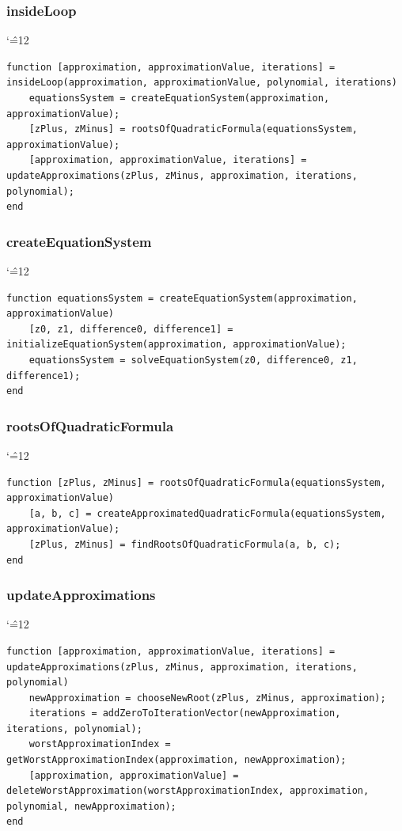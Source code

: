 \documentclass[12pt]{report}
\newenvironment{simplechar}{%
   \catcode`\^=12
}{}
\begin{document}
\subsubsection{insideLoop}
\begin{simplechar}
\begin{lstlisting}
function [approximation, approximationValue, iterations] = insideLoop(approximation, approximationValue, polynomial, iterations)
    equationsSystem = createEquationSystem(approximation, approximationValue);
    [zPlus, zMinus] = rootsOfQuadraticFormula(equationsSystem, approximationValue);
    [approximation, approximationValue, iterations] = updateApproximations(zPlus, zMinus, approximation, iterations, polynomial);
end
\end{lstlisting}
\end{simplechar}

\subsubsection{createEquationSystem}
\begin{simplechar}
\begin{lstlisting}
function equationsSystem = createEquationSystem(approximation, approximationValue)
    [z0, z1, difference0, difference1] = initializeEquationSystem(approximation, approximationValue);
    equationsSystem = solveEquationSystem(z0, difference0, z1, difference1);
end
\end{lstlisting}
\end{simplechar}

\subsubsection{rootsOfQuadraticFormula}
\begin{simplechar}
\begin{lstlisting}
function [zPlus, zMinus] = rootsOfQuadraticFormula(equationsSystem, approximationValue)
    [a, b, c] = createApproximatedQuadraticFormula(equationsSystem, approximationValue);
    [zPlus, zMinus] = findRootsOfQuadraticFormula(a, b, c);
end
\end{lstlisting}
\end{simplechar}

\subsubsection{updateApproximations}
\begin{simplechar}
\begin{lstlisting}
function [approximation, approximationValue, iterations] = updateApproximations(zPlus, zMinus, approximation, iterations, polynomial)
    newApproximation = chooseNewRoot(zPlus, zMinus, approximation);
    iterations = addZeroToIterationVector(newApproximation, iterations, polynomial);
    worstApproximationIndex = getWorstApproximationIndex(approximation, newApproximation);
    [approximation, approximationValue] = deleteWorstApproximation(worstApproximationIndex, approximation, polynomial, newApproximation);
end
\end{lstlisting}
\end{simplechar}
\end{document}
